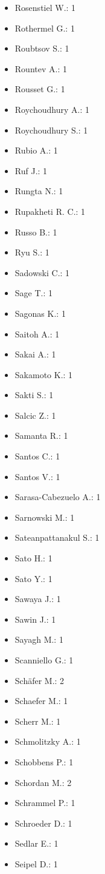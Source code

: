 \begin{itemize}
\item Rosenstiel W.: 1
\item Rothermel G.: 1
\item Roubtsov S.: 1
\item Rountev A.: 1
\item Rousset G.: 1
\item Roychoudhury A.: 1
\item Roychoudhury S.: 1
\item Rubio A.: 1
\item Ruf J.: 1
\item Rungta N.: 1
\item Rupakheti R. C.: 1
\item Russo B.: 1
\item Ryu S.: 1
\item Sadowski C.: 1
\item Sage T.: 1
\item Sagonas K.: 1
\item Saitoh A.: 1
\item Sakai A.: 1
\item Sakamoto K.: 1
\item Sakti S.: 1
\item Salcic Z.: 1
\item Samanta R.: 1
\item Santos C.: 1
\item Santos V.: 1
\item Sarasa-Cabezuelo A.: 1
\item Sarnowski M.: 1
\item Sateanpattanakul S.: 1
\item Sato H.: 1
\item Sato Y.: 1
\item Sawaya J.: 1
\item Sawin J.: 1
\item Sayagh M.: 1
\item Scanniello G.: 1
\item Sch\"{a}fer M.: 2
\item Schaefer M.: 1
\item Scherr M.: 1
\item Schmolitzky A.: 1
\item Schobbens P.: 1
\item Schordan M.: 2
\item Schrammel P.: 1
\item Schroeder D.: 1
\item Sedlar E.: 1
\item Seipel D.: 1

\end{itemize}
